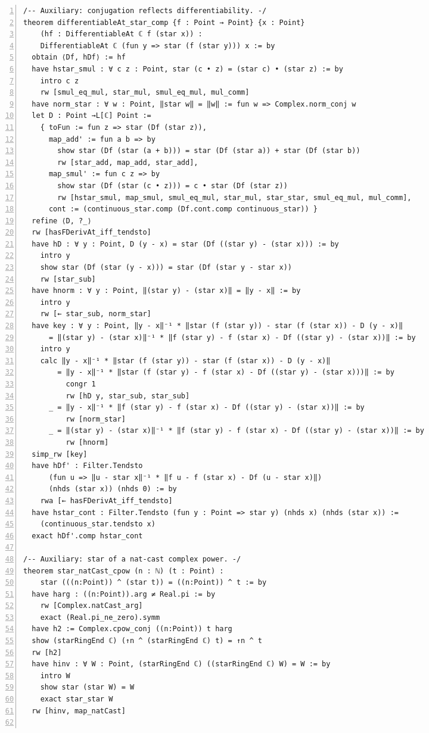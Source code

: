 \documentclass[10pt]{article}
\newcommand{\leansize}{\fontsize{5.5pt}{6.75pt}\selectfont}
\begin{document}
\begin{multicols}{2}
\begin{Verbatim}[numbers=left,firstnumber=1,numbersep=3pt,xleftmargin=2.6em,breaklines=true,breakanywhere=true,breakautoindent=false,breakindent=1.4em,breaksymbolleft={},breakanywheresymbolpre={},fontsize=\leansize]
/-- Auxiliary: conjugation reflects differentiability. -/
theorem differentiableAt_star_comp {f : Point → Point} {x : Point}
    (hf : DifferentiableAt ℂ f (star x)) :
    DifferentiableAt ℂ (fun y => star (f (star y))) x := by
  obtain ⟨Df, hDf⟩ := hf
  have hstar_smul : ∀ c z : Point, star (c • z) = (star c) • (star z) := by
    intro c z
    rw [smul_eq_mul, star_mul, smul_eq_mul, mul_comm]
  have norm_star : ∀ w : Point, ‖star w‖ = ‖w‖ := fun w => Complex.norm_conj w
  let D : Point →L[ℂ] Point :=
    { toFun := fun z => star (Df (star z)),
      map_add' := fun a b => by
        show star (Df (star (a + b))) = star (Df (star a)) + star (Df (star b))
        rw [star_add, map_add, star_add],
      map_smul' := fun c z => by
        show star (Df (star (c • z))) = c • star (Df (star z))
        rw [hstar_smul, map_smul, smul_eq_mul, star_mul, star_star, smul_eq_mul, mul_comm],
      cont := (continuous_star.comp (Df.cont.comp continuous_star)) }
  refine ⟨D, ?_⟩
  rw [hasFDerivAt_iff_tendsto]
  have hD : ∀ y : Point, D (y - x) = star (Df ((star y) - (star x))) := by
    intro y
    show star (Df (star (y - x))) = star (Df (star y - star x))
    rw [star_sub]
  have hnorm : ∀ y : Point, ‖(star y) - (star x)‖ = ‖y - x‖ := by
    intro y
    rw [← star_sub, norm_star]
  have key : ∀ y : Point, ‖y - x‖⁻¹ * ‖star (f (star y)) - star (f (star x)) - D (y - x)‖
      = ‖(star y) - (star x)‖⁻¹ * ‖f (star y) - f (star x) - Df ((star y) - (star x))‖ := by
    intro y
    calc ‖y - x‖⁻¹ * ‖star (f (star y)) - star (f (star x)) - D (y - x)‖
        = ‖y - x‖⁻¹ * ‖star (f (star y) - f (star x) - Df ((star y) - (star x)))‖ := by
          congr 1
          rw [hD y, star_sub, star_sub]
      _ = ‖y - x‖⁻¹ * ‖f (star y) - f (star x) - Df ((star y) - (star x))‖ := by
          rw [norm_star]
      _ = ‖(star y) - (star x)‖⁻¹ * ‖f (star y) - f (star x) - Df ((star y) - (star x))‖ := by
          rw [hnorm]
  simp_rw [key]
  have hDf' : Filter.Tendsto
      (fun u => ‖u - star x‖⁻¹ * ‖f u - f (star x) - Df (u - star x)‖)
      (nhds (star x)) (nhds 0) := by
    rwa [← hasFDerivAt_iff_tendsto]
  have hstar_cont : Filter.Tendsto (fun y : Point => star y) (nhds x) (nhds (star x)) :=
    (continuous_star.tendsto x)
  exact hDf'.comp hstar_cont

/-- Auxiliary: star of a nat-cast complex power. -/
theorem star_natCast_cpow (n : ℕ) (t : Point) :
    star (((n:Point)) ^ (star t)) = ((n:Point)) ^ t := by
  have harg : ((n:Point)).arg ≠ Real.pi := by
    rw [Complex.natCast_arg]
    exact (Real.pi_ne_zero).symm
  have h2 := Complex.cpow_conj ((n:Point)) t harg
  show (starRingEnd ℂ) (↑n ^ (starRingEnd ℂ) t) = ↑n ^ t
  rw [h2]
  have hinv : ∀ W : Point, (starRingEnd ℂ) ((starRingEnd ℂ) W) = W := by
    intro W
    show star (star W) = W
    exact star_star W
  rw [hinv, map_natCast]


\end{Verbatim}
\end{multicols}
\end{document}
